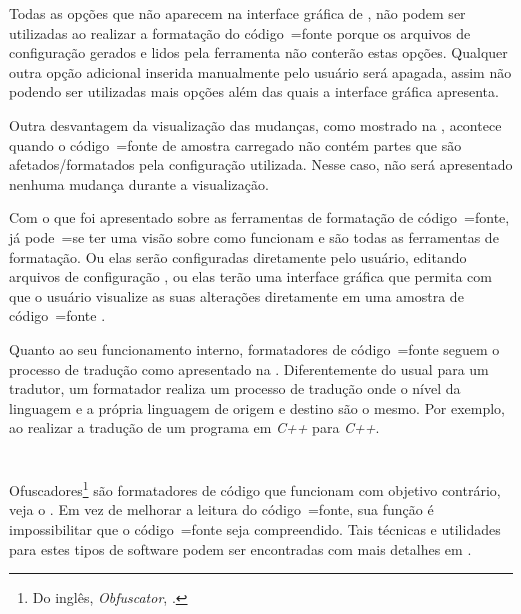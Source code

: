 Todas as opções que não aparecem na interface gráfica de ,
não podem ser utilizadas ao realizar a formatação do código~=fonte porque os arquivos de configuração gerados e
lidos pela ferramenta não conterão estas opções.
Qualquer outra opção adicional inserida manualmente pelo usuário será apagada,
assim não podendo ser utilizadas mais opções além das quais a interface gráfica apresenta.

Outra desvantagem da visualização das mudanças,
como mostrado na ,
acontece quando o código~=fonte de amostra carregado não contém partes que são afetados\slash{}formatados pela configuração utilizada.
Nesse caso,
não será apresentado nenhuma mudança durante a visualização.

Com o que foi apresentado sobre as ferramentas de formatação de código~=fonte,
já pode~=se ter uma visão sobre como funcionam e
são todas as ferramentas de formatação.
Ou elas serão configuradas diretamente pelo usuário,
editando arquivos de configuração \cite{uncrustifySourceCode},
ou elas terão uma interface gráfica que permita com que o usuário visualize as suas alterações diretamente em uma amostra de código~=fonte \cite{universalIndentGUI}.

Quanto ao seu funcionamento interno,
formatadores de código~=fonte seguem o processo de tradução como apresentado na .
Diferentemente do usual para um tradutor,
um formatador realiza um processo de tradução onde o nível da linguagem e
a própria linguagem de origem e
destino são o mesmo.
Por exemplo,
ao realizar a tradução de um programa em \textit{C++} para \textit{C++}.


\section{}

Ofuscadores\footnote{Do inglês,
\textit{Obfuscator},
.
}
são formatadores de código que funcionam com objetivo contrário,
veja o .
Em vez de melhorar a leitura do código~=fonte,
sua função é impossibilitar que o código~=fonte seja compreendido.
Tais técnicas e
utilidades para estes tipos de software podem ser encontradas com mais detalhes em .


